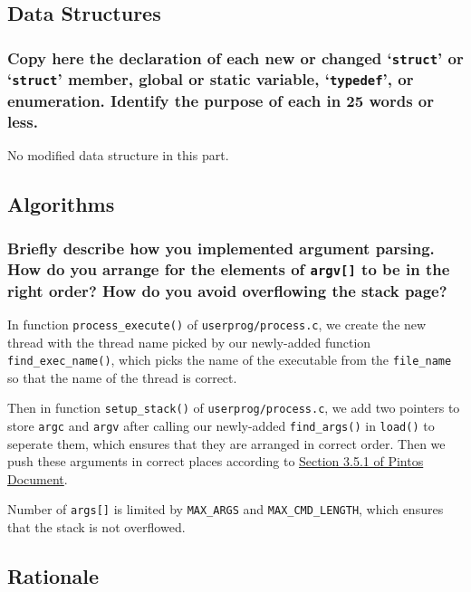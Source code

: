 \documentclass[sigconf, nonacm, balance=false, urlbreakonhyphens=true]{acmart}
\begin{document}
        \label{Argument Passing}
    
        \subsection{Data Structures}
        
            \subsubsection{Copy here the declaration of each new or changed `\texttt{struct}' or `\texttt{struct}' member, global or static variable, `\texttt{typedef}', or enumeration. Identify the purpose of each in 25 words or less. } 
            
            No modified data structure in this part. 
        
        \subsection{Algorithms}
        
            \subsubsection{Briefly describe how you implemented argument parsing.  How do you arrange for the elements of \texttt{argv[]} to be in the right order?  How do you avoid overflowing the stack page? }

            In function \texttt{process\_execute()} of \texttt{userprog/process.c}, we create the new thread with the thread name picked by our newly-added function \texttt{find\_exec\_name()}, which picks the name of the executable from the \texttt{file\_name} so that the name of the thread is correct. 

            Then in function \texttt{setup\_stack()} of \texttt{userprog/process.c}, we add two pointers to store \texttt{argc} and \texttt{argv} after calling our newly-added \texttt{find\_args()} in \texttt{load()} to seperate them, which ensures that they are arranged in correct order. Then we push these arguments in correct places according to \href{http://web.stanford.edu/~ouster/cgi-bin/cs140-spring20/pintos/pintos_3.html#SEC51}{Section 3.5.1 of Pintos Document}. 

            Number of \texttt{args[]} is limited by \texttt{MAX\_ARGS} and \texttt{MAX\_CMD\_LENGTH}, which ensures that the stack is not overflowed. 
        
        \subsection{Rationale}
            
\end{document}
